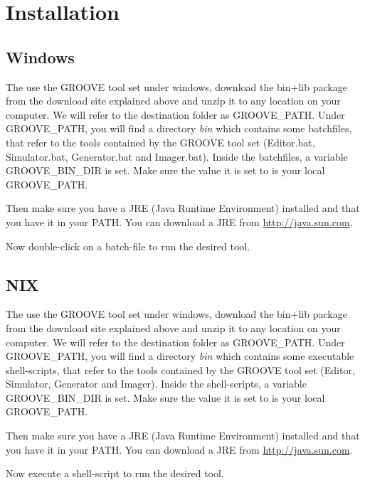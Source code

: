 \section{Installation}

\subsection{Windows}

The use the GROOVE tool set under windows, download the bin+lib package from the download site explained above and unzip it to any location on your computer. We will refer to the destination folder as GROOVE\_PATH. Under GROOVE\_PATH, you will find a directory \emph{bin} which contains some batchfiles, that refer to the tools contained by the GROOVE tool set (Editor.bat, Simulator.bat, Generator.bat and Imager.bat). Inside the batchfiles, a variable GROOVE\_BIN\_DIR is set. Make sure the value it is set to is your local GROOVE\_PATH.

Then make sure you have a JRE (Java Runtime Environment) installed and that you have it in your PATH. You can download a JRE from \url{http://java.sun.com}.

Now double-click on a batch-file to run the desired tool.

\subsection{NIX}

The use the GROOVE tool set under windows, download the bin+lib package from the download site explained above and unzip it to any location on your computer. We will refer to the destination folder as GROOVE\_PATH. Under GROOVE\_PATH, you will find a directory \emph{bin} which contains some executable shell-scripts, that refer to the tools contained by the GROOVE tool set (Editor, Simulator, Generator and Imager). Inside the shell-scripts, a variable GROOVE\_BIN\_DIR is set. Make sure the value it is set to is your local GROOVE\_PATH.

Then make sure you have a JRE (Java Runtime Environment) installed and that you have it in your PATH. You can download a JRE from \url{http://java.sun.com}.

Now execute a shell-script to run the desired tool.
